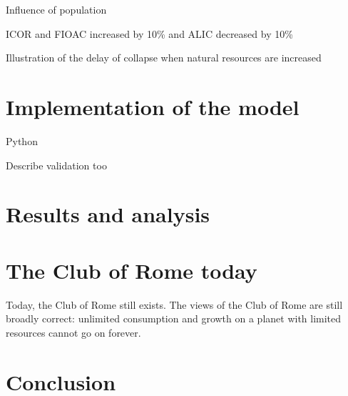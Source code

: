 \documentclass[10pt,a4paper]{scrartcl}
\begin{document}
Influence of population

ICOR and FIOAC increased by 10\% and ALIC decreased by 10\%

Illustration of the delay of collapse when natural resources are increased

\section*{Implementation of the model}

Python

Describe validation too

\section*{Results and analysis}

\section*{The Club of Rome today}

Today, the Club of Rome still exists. The views of the Club of Rome are still broadly correct: unlimited consumption and growth on a planet with limited resources cannot go on forever.

\section*{Conclusion}



\nocite{*}


\end{document}
